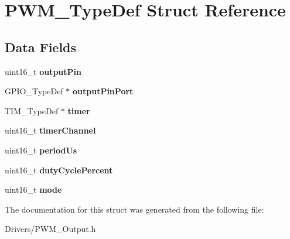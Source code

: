 \hypertarget{struct_p_w_m___type_def}{}\section{P\+W\+M\+\_\+\+Type\+Def Struct Reference}
\label{struct_p_w_m___type_def}
\subsection*{Data Fields}
\begin{DoxyCompactItemize}
\item 
\mbox{\label{struct_p_w_m___type_def_ac9de390b24b0d2e907571cccb9d6d2b9}} 
uint16\+\_\+t {\bfseries output\+Pin}
\item 
\mbox{\label{struct_p_w_m___type_def_a078cbe468c9fd678c2f5bb96ba35f845}} 
G\+P\+I\+O\+\_\+\+Type\+Def $\ast$ {\bfseries output\+Pin\+Port}
\item 
\mbox{\label{struct_p_w_m___type_def_a5f2d7e0e880def3262a850626e3df17d}} 
T\+I\+M\+\_\+\+Type\+Def $\ast$ {\bfseries timer}
\item 
\mbox{\label{struct_p_w_m___type_def_a2ceeb6205773419966e920a22828f526}} 
uint16\+\_\+t {\bfseries timer\+Channel}
\item 
\mbox{\label{struct_p_w_m___type_def_a550f3d976917596f0228732fceab7490}} 
uint16\+\_\+t {\bfseries period\+Us}
\item 
\mbox{\label{struct_p_w_m___type_def_a43833ca434f7e3c7d23ff9f780825da3}} 
uint16\+\_\+t {\bfseries duty\+Cycle\+Percent}
\item 
\mbox{\label{struct_p_w_m___type_def_af294e94ca5176720ef5e5cbedc95ca47}} 
uint16\+\_\+t {\bfseries mode}
\end{DoxyCompactItemize}


The documentation for this struct was generated from the following file\+:\begin{DoxyCompactItemize}
\item 
Drivers/P\+W\+M\+\_\+\+Output.\+h\end{DoxyCompactItemize}
